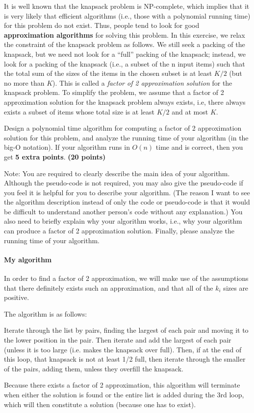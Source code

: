 \documentclass{article}
\begin{document}
It is well known that the knapsack problem is NP-complete, which
implies that it is very likely that efficient algorithms (i.e., those
with a polynomial running time) for this problem do not exist. Thus,
people tend to look for good {\bf approximation algorithms} for
solving this problem. In this exercise, we relax the constraint of the
knapsack problem as follows. We still seek a packing of the knapsack,
but we need not look for a ``full'' packing of the knapsack; instead,
we look for a packing of the knapsack (i.e., a subset of the n input
items) such that the total sum of the sizes of the items in the chosen
subset is at least $K/2$ (but no more than $K$). This is called a
\emph{factor of 2 approximation solution} for the knapsack problem. To 
simplify the problem, we assume that a factor of 2 approximation
solution for the knapsack problem always exists, i.e, there always
exists a subset of items whose total size is at least $K/2$ and at
most $K$. 

Design a polynomial time algorithm for computing a factor of 2
approximation solution for this problem, and analyze the running time
of your algorithm (in the big-O notation). If your algorithm runs in
$O(n)$ time and is correct, then you get {\bf 5 extra points}. {\bf(20
  points)} 

Note: You are required to clearly describe the main idea of your
algorithm. Although the pseudo-code is not required, you may also give
the pseudo-code if you feel it is helpful for you to describe your
algorithm. (The reason I want to see the algorithm description instead
of only the code or pseudo-code is that it would be difficult to
understand another person's code without any explanation.) You also
need to briefly explain why your algorithm works, i.e., why your
algorithm can produce a factor of 2 approximation solution. Finally,
please analyze the running time of your algorithm. 

\paragraph{My algorithm}





In order to find a factor of 2 approximation, we will make use of the
assumptions that there definitely exists such an approximation, and
that all of the $k_i$ sizes are positive.

The algorithm is as follows:

Iterate through the list by pairs, finding the largest of each pair
and moving it to the lower position in the pair.
Then iterate and add the largest of each pair (unless it is too large
(i.e. makes the knapsack over full).
Then, if at the end of this loop, that knapsack is not at least 1/2
full, then iterate through the smaller of the pairs, adding them,
unless they overfill the knapsack.

Because there exists a factor of 2 approximation, this algorithm will
terminate when either the solution is found or the entire list is
added during the 3rd loop, which will then constitute a solution
(because one has to exist).
\end{document}
